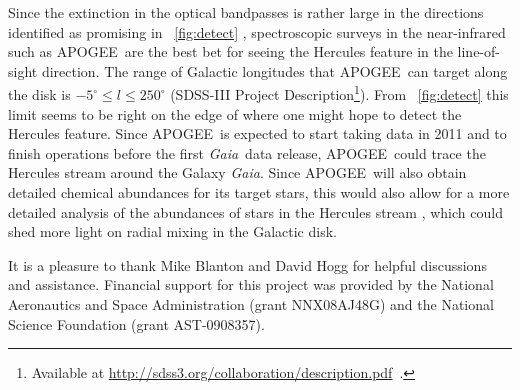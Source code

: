 \documentclass[12pt,preprint]{aastex}
\newcommand{\eg}{e.g.}
\newcommand{\Gaia}{\emph{Gaia}}
\newcommand{\apogee}{APOGEE}
\begin{document}
Since the extinction in the optical bandpasses is rather large in the
directions identified as promising in \figurename~\ref{fig:detect}
\citep[$A_V \approx 8$ mag toward $l \approx
  270^{\circ}$;][]{marshall06a}, spectroscopic surveys in the
near-infrared such as \apogee\ are the best bet for seeing the
Hercules feature in the line-of-sight direction. The range of Galactic
longitudes that \apogee\ can target along the disk is $-5^{\circ} \leq
l \leq 250^{\circ}$ (SDSS-III Project Description\footnote{Available
  at \url{http://sdss3.org/collaboration/description.pdf}~.}). From
\figurename~\ref{fig:detect} this limit seems to be right on the edge
of where one might hope to detect the Hercules feature. Since
\apogee\ is expected to start taking data in 2011 and to finish
operations before the first \Gaia\ data release, \apogee\ could trace
the Hercules stream around the Galaxy \Gaia. Since \apogee\ will also
obtain detailed chemical abundances for its target stars, this would
also allow for a more detailed analysis of the abundances of stars in
the Hercules stream \citep[following, \eg,][]{Bensby07a,Bovy10a},
which could shed more light on radial mixing in the Galactic disk.

\acknowledgements It is a pleasure to thank Mike Blanton and David
Hogg for helpful discussions and assistance.  Financial support for
this project was provided by the National Aeronautics and Space
Administration (grant NNX08AJ48G) and the National Science Foundation
(grant AST-0908357).
\end{document}
